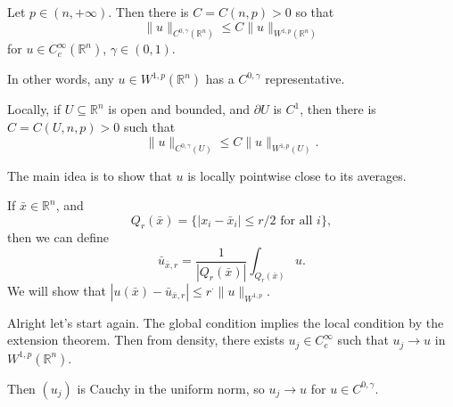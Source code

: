 \documentclass[12pt]{article}
\begin{document}
\begin{theorem}
	Let $p \in (n, +\infty).$ Then there is $C = C(n, p) > 0$ so that
	\[
	\|u\|_{C^{0, \gamma}(\mathbb{R}^n)} \leq C \|u\|_{W^{1,p}(\mathbb{R}^n)}
	\]
	for $u \in C^{\infty}_c(\mathbb{R}^n)$, $\gamma \in (0, 1)$.

	In other words, any $u \in W^{1,p}(\mathbb{R}^n)$ has a $C^{0, \gamma}$ representative.

	Locally, if $U \subseteq \mathbb{R}^n$ is open and bounded, and $\partial U$ is $C^1$, then there is $C  = C(U, n, p) > 0$ such that
	\[
	\|u\|_{C^{0, \gamma} (U)} \leq C \|u\|_{W^{1,p}(U)}.
	\]
\end{theorem}

\begin{proofbox}
	The main idea is to show that $u$ is locally pointwise close to its averages.

	If $\bar x \in \mathbb{R}^n$, and 
	\[
		Q_r(\bar x) = \{ |x_i - \bar x_i| \leq r/2 \text{ for all } i \},
	\]
	then we can define
	\[
	\bar u_{\bar x, r} = \frac{1}{|Q_r(\bar x)|} \int_{Q_r(\bar x)} u.
	\]
	We will show that $|u(\bar x) - \bar u_{\bar x, r}| \leq r^{\cdot} \|u\|_{W^{1,p}}$.

	Alright let's start again. The global condition implies the local condition by the extension theorem. Then from density, there exists $u_j \in C_c^{\infty}$ such that $u_j \to u$ in $W^{1, p}(\mathbb{R}^n)$.

	Then $(u_j)$ is Cauchy in the uniform norm, so $u_j \to u$ for $u \in C^{0, \gamma}$.


\end{proofbox}
\end{document}
